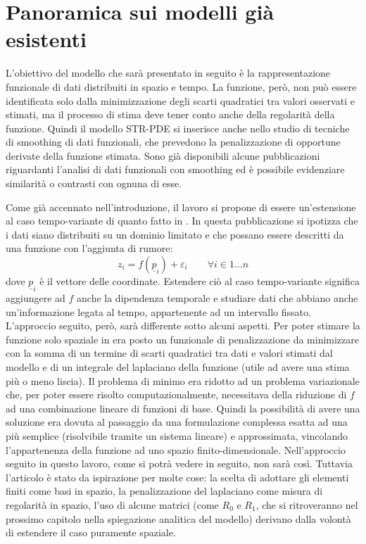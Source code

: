 \documentclass[a4paper,11pt,twoside,openright]{book}							%
\begin{document}
\chapter{Panoramica sui modelli già esistenti}
\label{cap:panoramica}

L'obiettivo del modello che sarà presentato in seguito è la rappresentazione funzionale di dati distribuiti in spazio e tempo. La funzione, però, non può essere identificata solo dalla minimizzazione degli scarti quadratici tra valori osservati e stimati, ma il processo di stima deve tener conto anche della regolarità della funzione. Quindi il modello STR-PDE si inserisce anche nello studio di tecniche di smoothing di dati funzionali, che prevedono la penalizzazione di opportune derivate della funzione stimata. Sono già disponibili alcune pubblicazioni riguardanti l'analisi di dati funzionali con smoothing ed è possibile evidenziare similarità o contrasti con ognuna di esse. 

Come già accennato nell'introduzione, il lavoro si propone di essere un'estensione al caso tempo-variante di quanto fatto in \cite{art:sangalli}. In questa pubblicazione si ipotizza che i dati siano distribuiti su un dominio limitato e che possano essere descritti da una funzione con l'aggiunta di rumore:
$$
z_i=f(\underline{p}_i) + \varepsilon_i \qquad \forall i \in 1\ldots n
$$
dove $\underline{p}_i$ è il vettore delle coordinate. Estendere ciò al caso tempo-variante significa aggiungere ad $f$ anche la dipendenza temporale e studiare dati che abbiano anche un'informazione legata al tempo, appartenente ad un intervallo fissato. L'approccio seguito, però, sarà differente sotto alcuni aspetti. Per poter stimare la funzione solo spaziale in \cite{art:sangalli} era posto un funzionale di penalizzazione da minimizzare con la somma di un termine di scarti quadratici tra dati e valori stimati dal modello e di un integrale del laplaciano della funzione (utile ad avere una stima più o meno liscia). Il problema di minimo era ridotto ad un problema variazionale che, per poter essere risolto computazionalmente, necessitava della riduzione di $f$ ad una combinazione lineare di funzioni di base. Quindi la possibilità di avere una soluzione era dovuta al passaggio da una formulazione complessa esatta ad una più semplice (risolvibile tramite un sistema lineare) e approssimata, vincolando l'appartenenza della funzione ad uno spazio finito-dimensionale. Nell'approccio seguito in questo lavoro, come si potrà vedere in seguito, non sarà così. Tuttavia l'articolo è stato da ispirazione per molte cose: la scelta di adottare gli elementi finiti come basi in spazio, la penalizzazione del laplaciano come misura di regolarità in spazio, l'uso di alcune matrici (come $R_0$ e $R_1$, che si ritroveranno nel prossimo capitolo nella spiegazione analitica del modello) derivano dalla volontà di estendere il caso puramente spaziale.
\end{document}

